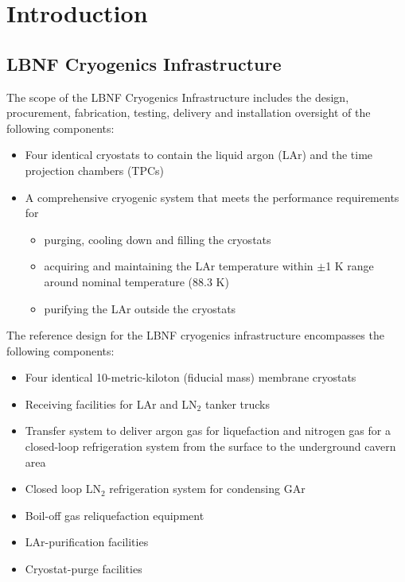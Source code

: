 \chapter{Introduction}
\label{ch:cryo-intro}

\section{LBNF Cryogenics Infrastructure}
\label{sec:cryo-intro-fd}

The scope of the LBNF Cryogenics Infrastructure includes the design, 
procurement, fabrication, testing, delivery and installation
oversight of the following components:
\begin{itemize}
 \item {Four identical cryostats to contain the liquid argon (LAr) 
       and the time projection chambers (TPCs)} 
 \item {A comprehensive cryogenic system that meets the performance 
       requirements for}
 \begin{itemize} 
  \item {purging, cooling down and filling the cryostats}
  \item {acquiring and maintaining the LAr temperature within 
        $\pm$1 K range around nominal temperature (88.3 K)} 
  \item {purifying the LAr outside the cryostats}
 \end{itemize}
\end{itemize}

The reference design for the LBNF cryogenics infrastructure 
encompasses the following components:

\begin{itemize}
\item Four identical 10-metric-kiloton (fiducial mass) membrane cryostats 
\item Receiving facilities for LAr and LN$_2$ tanker trucks 
\item Transfer system to deliver argon gas for liquefaction and 
      nitrogen gas for a closed-loop refrigeration system from the
      surface to the underground cavern area
\item Closed loop LN$_2$ refrigeration system for condensing GAr
\item Boil-off gas reliquefaction equipment
\item LAr-purification facilities
\item Cryostat-purge facilities
\end{itemize}

